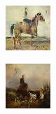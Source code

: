 \documentclass[a4paper]{article}
\begin{document}
\begin{figure}[!h]
\begin{minipage}[ht]{0.5\textwidth}
\begin{subfigure}[b]{0.2\textwidth}
        \includegraphics[width=\textwidth]{man_3.jpg}
    \end{subfigure}
    \begin{subfigure}[b]{0.2\textwidth}
        \includegraphics[width=\textwidth]{man_4.jpg}
    \end{subfigure}
  \end{minipage}
\end{figure}
\end{document}
